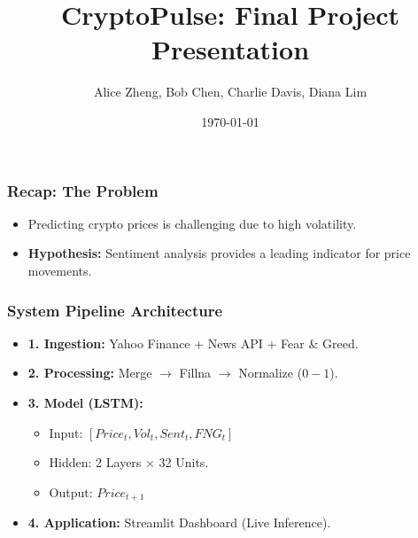 \documentclass{beamer}
\title{CryptoPulse: Final Project Presentation}
\author{Alice Zheng, Bob Chen, Charlie Davis, Diana Lim}
\institute{SUTD}
\date{\today}
\begin{document}
\frame{\titlepage}

\begin{frame}
\frametitle{Recap: The Problem}
\begin{itemize}
    \item Predicting crypto prices is challenging due to high volatility.
    \item \textbf{Hypothesis:} Sentiment analysis provides a leading indicator for price movements.
\end{itemize}
\end{frame}


\begin{frame}
\frametitle{System Pipeline Architecture}
\begin{itemize}
    \item \textbf{1. Ingestion:} Yahoo Finance + News API + Fear \& Greed.
    \item \textbf{2. Processing:} Merge $\rightarrow$ Fillna $\rightarrow$ Normalize ($0-1$).
    \item \textbf{3. Model (LSTM):}
    \begin{itemize}
        \item Input: $[Price_t, Vol_t, Sent_t, FNG_t]$
        \item Hidden: 2 Layers $\times$ 32 Units.
        \item Output: $Price_{t+1}$
    \end{itemize}
    \item \textbf{4. Application:} Streamlit Dashboard (Live Inference).
\end{itemize}
\end{frame}
\end{document}

